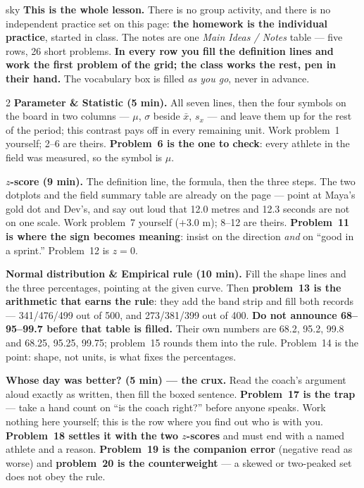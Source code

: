 \documentclass[10pt]{article}
\begin{document}
\boxguard
\begin{skillbox}{sky}
\textbf{This is the whole lesson.} There is no group activity, and there is no independent
practice set on this page: \textbf{the homework is the individual practice}, started in class.
The notes are one \emph{Main Ideas / Notes} table --- five rows, 26 short problems. \textbf{In
every row you fill the definition lines and work the first problem of the grid; the class works
the rest, pen in their hand.} The vocabulary box is filled \emph{as you go}, never in advance.
\begin{multicols}{2}
\textbf{Parameter \& Statistic (5 min).} All seven lines, then the four symbols on the board in
two columns --- $\mu$, $\sigma$ beside $\bar x$, $s_x$ --- and leave them up for the rest of the
period; this contrast pays off in every remaining unit. Work problem~1 yourself; 2--6 are theirs.
\textbf{Problem~6 is the one to check}: every athlete in the field was measured, so the symbol is
$\mu$.

\textbf{$z$-score (9 min).} The definition line, the formula, then the three steps. The two
dotplots and the field summary table are already on the page --- point at Maya's gold dot and
Dev's, and say out loud that 12.0 metres and 12.3 seconds are not on one scale. Work problem~7
yourself ($+3.0$ m); 8--12 are theirs. \textbf{Problem~11 is where the sign becomes meaning}:
insist on the direction \emph{and} on ``good in a sprint.'' Problem~12 is $z = 0$.

\textbf{Normal distribution \& Empirical rule (10 min).} Fill the shape lines and the three
percentages, pointing at the given curve. Then \textbf{problem~13 is the arithmetic that earns
the rule}: they add the band strip and fill both records --- 341/476/499 out of 500, and
273/381/399 out of 400. \textbf{Do not announce 68--95--99.7 before that table is filled.} Their
own numbers are 68.2, 95.2, 99.8 and 68.25, 95.25, 99.75; problem~15 rounds them into the rule.
Problem~14 is the point: shape, not units, is what fixes the percentages.

\columnbreak
\textbf{Whose day was better? (5 min) --- the crux.} Read the coach's argument aloud exactly as
written, then fill the boxed sentence. \textbf{Problem~17 is the trap} --- take a hand count on
``is the coach right?'' before anyone speaks. Work nothing here yourself; this is the row where
you find out who is with you. \textbf{Problem~18 settles it with the two $z$-scores} and must end
with a named athlete and a reason. \textbf{Problem~19 is the companion error} (negative read as
worse) and \textbf{problem~20 is the counterweight} --- a skewed or two-peaked set does not obey
the rule.


\end{multicols}
\end{skillbox}
\end{document}
